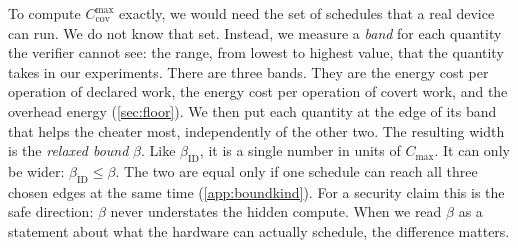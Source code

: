 \documentclass{article}
\theoremstyle{plain}
\theoremstyle{definition}
\theoremstyle{remark}
\begin{document}
To compute $C_{\mathrm{cov}}^{\max}$ exactly, we would need the set of
schedules that a real device can run. We do not know that set. Instead, we
measure a \emph{band} for each quantity the verifier cannot see: the range,
from lowest to highest value, that the quantity takes in our experiments.
There are three bands. They are the energy cost per operation of declared
work, the energy cost per operation of covert work, and the overhead energy
(\cref{sec:floor}). We then put each quantity at the edge of its band that
helps the cheater most, independently of the other two. The resulting width
is the \emph{relaxed bound} $\beta$. Like $\beta_{\mathrm{ID}}$, it is a
single number in units of $C_{\max}$. It can only be wider:
$\beta_{\mathrm{ID}} \leq \beta$. The two are equal only if one schedule can
reach all three chosen edges at the same time (\cref{app:boundkind}). For a
security claim this is the safe direction: $\beta$ never understates the
hidden compute. When we read $\beta$ as
a statement about what the hardware can actually schedule, the difference
matters.
\end{document}
